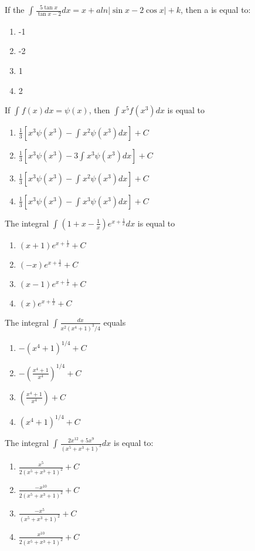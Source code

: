 \item If the $\int_{}\frac{5\tan x}{\tan x - 2}dx = x + aln|\sin x - 2\cos x| + k$, then a is equal to:
\begin{enumerate}
\item -1
\item -2
\item 1
\item 2
\end{enumerate}

\item If $\int_{}f(x)dx = \psi(x)$, then $\int_{}x^5f(x^3)dx$ is equal to
\begin{enumerate}
\item $\frac{1}{3}[x^3\psi(x^3) - \int_{}x^2\psi(x^3)dx] + C$
\item $\frac{1}{3}[x^3\psi(x^3) - 3\int_{}x^3\psi(x^3)dx] + C$
\item $\frac{1}{3}[x^3\psi(x^3) - \int_{}x^2\psi(x^3)dx] + C$
\item $\frac{1}{3}[x^3\psi(x^3) - \int_{}x^3\psi(x^3)dx] + C$
\end{enumerate}

\item The integral $\int_{}(1 + x -\frac{1}{x})e^{x + \frac{1}{x}}dx$ is equal to
\begin{enumerate}
\item $(x + 1)e^{x + \frac{1}{x}} + C$
\item $(-x)e^{x + \frac{1}{x}} + C$
\item $(x - 1)e^{x + \frac{1}{x}} + C$
\item $(x)e^{x + \frac{1}{x}} + C$
\end{enumerate}

\item The integral $\int_{}\frac{dx}{x^2(x^4 + 1)^3/4}$ equals
\begin{enumerate}
\item $-(x^4 + 1)^{1/4} + C$
\item $-(\frac{x^4 + 1}{x^4})^{1/4} + C$
\item $(\frac{x^4 + 1}{x^4}) + C$
\item $(x^4 + 1)^{1/4} + C$
\end{enumerate}

\item The integral $\int_{}\frac{2x^{12} + 5x^9}{(x^5 + x^3 + 1)^3}dx$ is equal to:
\begin{enumerate}
\item $\frac{x^5}{2(x^5 + x^3 + 1)^2} + C$
\item $\frac{-x^{10}}{2(x^5 + x^3 + 1)^2} + C$
\item $\frac{-x^5}{(x^5 + x^3 + 1)^2} + C$
\item $\frac{x^{10}}{2(x^5 + x^3 + 1)^2} + C$
\end{enumerate}

